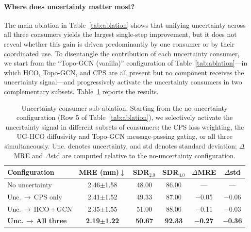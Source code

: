 \documentclass[conference]{IEEEtran}
\begin{document}
\paragraph{Where does uncertainty matter most?}
The main ablation in Table~\ref{tab:ablation} shows that unifying uncertainty across all three consumers yields the largest single-step improvement, but it does not reveal whether this gain is driven predominantly by one consumer or by their coordinated use. To disentangle the contribution of each uncertainty consumer, we start from the ``Topo-GCN (vanilla)'' configuration of Table~\ref{tab:ablation}---in which HCO, Topo-GCN, and CPS are all present but no component receives the uncertainty signal---and progressively activate the uncertainty consumers in two complementary subsets. Table~\ref{tab:ablation_uncertainty} reports the results.

\begin{table}[t]
\centering
\caption{Uncertainty consumer sub-ablation. Starting from the no-uncertainty configuration (Row 5 of Table~\ref{tab:ablation}), we selectively activate the uncertainty signal in different subsets of consumers: the CPS loss weighting, the UG-HCO diffusivity and Topo-GCN message-passing gating, or all three simultaneously. Unc. denotes uncertainty, and std denotes standard deviation; $\Delta$MRE and $\Delta$std are computed relative to the no-uncertainty configuration.}
\label{tab:ablation_uncertainty}
\setlength{\tabcolsep}{2pt}
\small
\begin{tabular}{l c c c c c}
\toprule
Configuration & MRE (mm)$\downarrow$ & \scriptsize SDR$_{2.0}$ & \scriptsize SDR$_{4.0}$ & $\Delta$MRE & $\Delta$std \\
\midrule
No uncertainty              & 2.46$\pm$1.58 & 48.00 & 86.00 & ---     & ---     \\
Unc.\,$\to$\,CPS only       & 2.41$\pm$1.52 & 49.33 & 87.00 & $-$0.05 & $-$0.06 \\
Unc.\,$\to$\,HCO\,+\,GCN    & 2.35$\pm$1.55 & 51.00 & 88.00 & $-$0.11 & $-$0.03 \\
\midrule
\textbf{Unc.\,$\to$\,All three}  & \textbf{2.19$\pm$1.22} & \textbf{50.67} & \textbf{92.33} & \textbf{$-$0.27} & \textbf{$-$0.36} \\
\bottomrule
\end{tabular}
\end{table}
\end{document}
